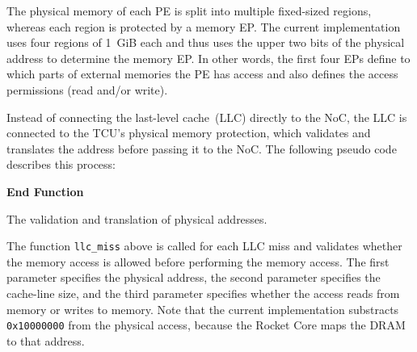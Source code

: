 The physical memory of each PE is split into multiple fixed-sized regions, whereas each region is
protected by a memory EP. The current implementation uses four regions of 1~GiB each and thus uses
the upper two bits of the physical address to determine the memory EP. In other words, the first
four EPs define to which parts of external memories the PE has access and also defines the access
permissions (read and/or write).

Instead of connecting the last-level cache~(LLC) directly to the NoC, the LLC is connected to the
TCU's physical memory protection, which validates and translates the address before passing it to
the NoC. The following pseudo code describes this process:\\[.2em]

\begin{algorithm}[H]
    \textbf{End Function}
    \caption{The validation and translation of physical addresses.}
    \label{code:pmp}
\end{algorithm}

\noindent The function \texttt{llc\_miss} above is called for each LLC miss and validates whether
the memory access is allowed before performing the memory access. The first parameter specifies the
physical address, the second parameter specifies the cache-line size, and the third parameter
specifies whether the access reads from memory or writes to memory. Note that the current
implementation substracts \texttt{0x10000000} from the physical access, because the Rocket Core maps
the DRAM to that address.
\extend{}
